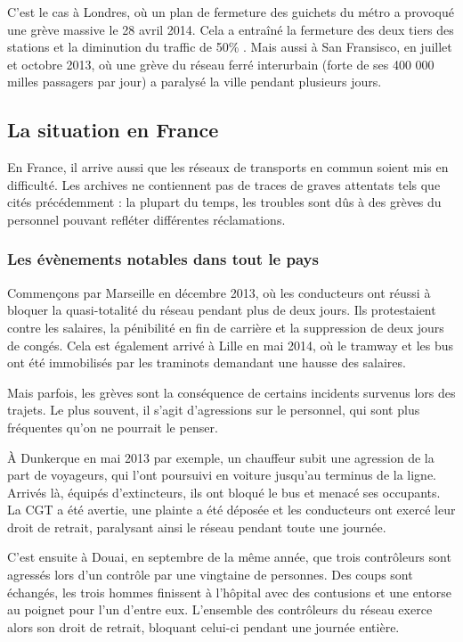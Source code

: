	C'est le cas à Londres, où un plan de fermeture des guichets du métro a provoqué une grève massive le 28 avril 2014. Cela a entraîné la fermeture des deux tiers des stations et la diminution du traffic de 50\% \cite{tubeApril}. Mais aussi à San Fransisco, en juillet et octobre 2013, où une grève du réseau ferré interurbain (forte de ses 400 000 milles passagers par jour) a paralysé la ville pendant plusieurs jours. \cite{SFbart}

	\subsection{La situation en France}
	
	En France, il arrive aussi que les réseaux de transports en commun soient mis en difficulté. Les archives ne contiennent pas de traces de graves attentats tels que cités précédemment : la plupart du temps, les troubles sont dûs à des grèves du personnel pouvant refléter différentes réclamations.
	
	\subsubsection{ Les évènements notables dans tout le pays }

	Commençons par Marseille en décembre 2013, où les conducteurs ont réussi à bloquer la quasi-totalité du réseau pendant plus de deux jours. Ils protestaient contre les salaires, la pénibilité en fin de carrière et la suppression de deux jours de congés. Cela est également arrivé à Lille en mai 2014, où le tramway et les bus ont été immobilisés par les traminots demandant une hausse des salaires.

	Mais parfois, les grèves sont la conséquence de certains incidents survenus lors des trajets. Le plus souvent, il s'agit d'agressions sur le personnel, qui sont plus fréquentes qu'on ne pourrait le penser.

	À Dunkerque en mai 2013 par exemple, un chauffeur subit une agression de la part de voyageurs, qui l'ont poursuivi en voiture jusqu'au terminus de la ligne. Arrivés là, équipés d'extincteurs, ils ont bloqué le bus et menacé ses occupants. La CGT a été avertie, une plainte a été déposée et les conducteurs ont exercé leur droit de retrait, paralysant ainsi le réseau pendant toute une journée.

	C'est ensuite à Douai, en septembre de la même année, que trois contrôleurs sont agressés lors d'un contrôle par une vingtaine de personnes. Des coups sont échangés, les trois hommes finissent à l'hôpital avec des contusions et une entorse au poignet pour l'un d'entre eux. L'ensemble des contrôleurs du réseau exerce alors son droit de retrait, bloquant celui-ci pendant une journée entière.

